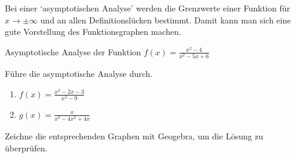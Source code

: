 \clearpage
Bei einer `asymptotischen Analyse' werden die Grenzwerte einer Funktion für $x\to\pm\infty$ und an allen Definitionslücken bestimmt. Damit kann man sich eine gute Vorstellung des Funktionsgraphen machen.

\begin{bsp}
    {Asymptotische Analyse der Funktion $f(x)= \frac{x^2-4}{x^2-5x+6}$}{}
    
    \vspace*{19cm}
\end{bsp}

\begin{ueb}
    {}{}
    Führe die asymptotische Analyse durch.
    \begin{enumerate}
        \item $f(x) = \frac{x^2-2x-3}{x^2-9}$
        \item $g(x) = \frac{x}{x^3-4x^2+4x}$
    \end{enumerate}

    Zeichne die entsprechenden Graphen mit Geogebra, um die Lösung zu überprüfen. 
\end{ueb}